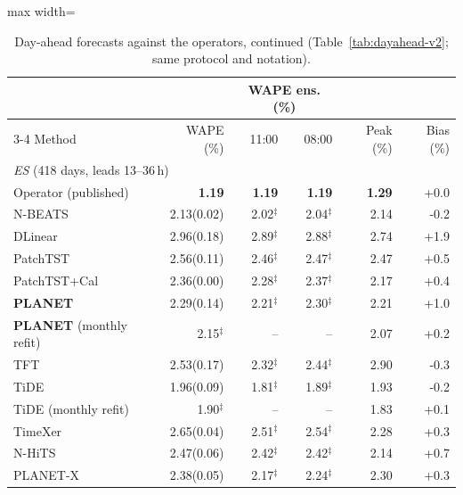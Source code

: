 \begin{table}[!t]
\centering
\caption{Day-ahead forecasts against the operators, continued (Table~\ref{tab:dayahead-v2}; same protocol and notation).}
\label{tab:dayahead-v2-b}
\setlength{\tabcolsep}{2.5pt}\footnotesize
\begin{adjustbox}{max width=\linewidth}
\begin{tabular}{lrrrrr}
\toprule
 & & \multicolumn{2}{c}{WAPE ens. (\%)} & & \\
\cmidrule(lr){3-4}
Method & WAPE (\%) & 11:00 & 08:00 & Peak (\%) & Bias (\%) \\
\midrule
\multicolumn{6}{l}{\textit{ES} (418 days, leads 13--36\,h)} \\
\quad Operator (published) & \textbf{1.19} & \textbf{1.19} & \textbf{1.19} & \textbf{1.29} & +0.0 \\
\quad N-BEATS & 2.13{\scriptsize\color{gray}(0.02)} & 2.02$^{\ddagger}$ & 2.04$^{\ddagger}$ & 2.14 & -0.2 \\
\quad DLinear & 2.96{\scriptsize\color{gray}(0.18)} & 2.89$^{\ddagger}$ & 2.88$^{\ddagger}$ & 2.74 & +1.9 \\
\quad PatchTST & 2.56{\scriptsize\color{gray}(0.11)} & 2.46$^{\ddagger}$ & 2.47$^{\ddagger}$ & 2.47 & +0.5 \\
\quad PatchTST+Cal & 2.36{\scriptsize\color{gray}(0.00)} & 2.28$^{\ddagger}$ & 2.37$^{\ddagger}$ & 2.17 & +0.4 \\
\quad \textbf{PLANET} & 2.29{\scriptsize\color{gray}(0.14)} & 2.21$^{\ddagger}$ & 2.30$^{\ddagger}$ & 2.21 & +1.0 \\
\quad \textbf{PLANET} (monthly refit) & 2.15$^{\ddagger}$ & -- & -- & 2.07 & +0.2 \\
\quad TFT & 2.53{\scriptsize\color{gray}(0.17)} & 2.32$^{\ddagger}$ & 2.44$^{\ddagger}$ & 2.90 & -0.3 \\
\quad TiDE & 1.96{\scriptsize\color{gray}(0.09)} & 1.81$^{\ddagger}$ & 1.89$^{\ddagger}$ & 1.93 & -0.2 \\
\quad TiDE (monthly refit) & 1.90$^{\ddagger}$ & -- & -- & 1.83 & +0.1 \\
\quad TimeXer & 2.65{\scriptsize\color{gray}(0.04)} & 2.51$^{\ddagger}$ & 2.54$^{\ddagger}$ & 2.28 & +0.3 \\
\quad N-HiTS & 2.47{\scriptsize\color{gray}(0.06)} & 2.42$^{\ddagger}$ & 2.42$^{\ddagger}$ & 2.14 & +0.7 \\
\quad PLANET-X & 2.38{\scriptsize\color{gray}(0.05)} & 2.17$^{\ddagger}$ & 2.24$^{\ddagger}$ & 2.30 & +0.3 \\

\end{tabular}
\end{adjustbox}
\end{table}
